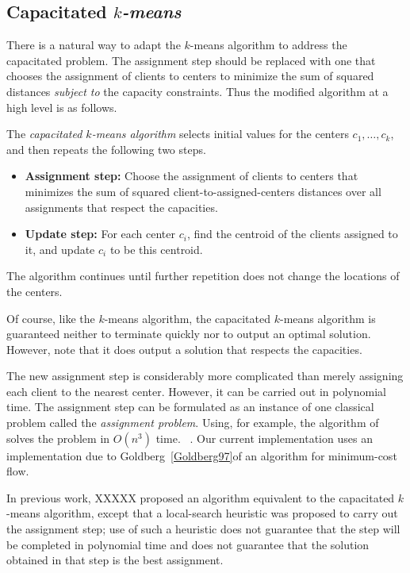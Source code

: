 \subsection{Capacitated {\em $k$-means}}

There is a natural way to adapt the $k$-means algorithm to address the
capacitated problem.  The assignment step should be replaced with one
that chooses the assignment of clients to centers to minimize the sum
of squared distances {\em subject to} the capacity constraints.  Thus
the modified algorithm at a high level is as follows.

The {\em capacitated $k$-means algorithm} selects initial values for
the centers $c_1, \ldots, c_k$, and then repeats the following two
steps.
\begin{itemize}
\item {\bf Assignment step:} Choose the assignment of clients to
  centers that minimizes the sum of squared client-to-assigned-centers
  distances over all assignments that respect the capacities.
\item {\bf Update step:} For each center $c_i$, find the centroid of
  the clients assigned to it, and update $c_i$ to be this centroid.
\end{itemize}
The algorithm continues until further repetition does not change the
locations of the centers.

Of course, like the $k$-means algorithm, the capacitated $k$-means
algorithm is guaranteed neither to terminate quickly nor to output an
optimal solution.  However, note that it does output a solution that
respects the capacities.  

The new assignment step is considerably more complicated than merely
assigning each client to the nearest center.  However, it can be
carried out in polynomial time.  The assignment step can be formulated
as an instance of one classical problem called the {\em assignment
  problem}.  Using, for example, the algorithm of~\cite{FredmanT}
solves the problem in $O(n^3)$ time.  ~\cite{GabowT1989}.
Our current implementation uses an implementation due to
Goldberg~\ref{Goldberg97}of an algorithm for minimum-cost flow.

In previous work, XXXXX proposed an algorithm equivalent to the
capacitated $k$-means algorithm, except that a local-search heuristic
was proposed to carry out the assignment step; use of such a heuristic
does not guarantee that the step will be completed in polynomial time
and does not guarantee that the solution obtained in that step is the
best assignment.

